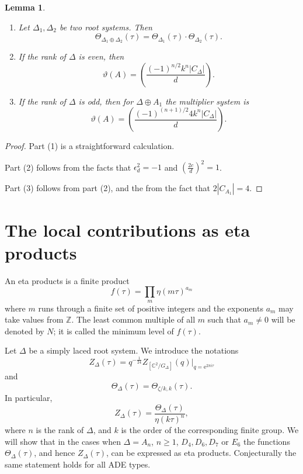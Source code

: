 \documentclass[11pt,a4paper]{amsart}
\newtheorem{lemma}[theorem]{Lemma}
\theoremstyle{definition}
\newcommand{\SZ}{\mathbb{Z}}                    %
\newcommand{\SC}{\mathbb{C}}                    %
\begin{document}
\begin{lemma} 
\begin{enumerate}
\item 
Let $\Delta_1,\Delta_2$ be two root systems. Then
\[ \Theta_{\Delta_1 \oplus \Delta_2}(\tau)=\Theta_{\Delta_1}(\tau)\cdot \Theta_{\Delta_2}(\tau). \]
\item If the rank of $\Delta$ is even, then
\[ \vartheta(A)= \left( \frac{(-1)^{n/2} k^n |C_{\Delta}|}{d} \right). \]
\item If the rank of $\Delta$ is odd, then for $\Delta \oplus A_1$ the multiplier system is
\[ \vartheta(A)= \left( \frac{(-1)^{(n+1)/2} 4k^n|C_{\Delta}|}{d} \right). \]
\end{enumerate}
\end{lemma}
\begin{proof} Part (1) is a straightforward calculation.

Part (2) follows from the facts that $\epsilon_d^2=-1$ and $\left( \frac{2c}{d}\right)^2=1$.

Part (3) follows from part (2), and the from the fact that $2|C_{A_1}|=4$.
\end{proof}

\section{The local contributions as eta products}
\label{sec:locetaprod}

An eta products is a finite product
\begin{equation} f(\tau)=\prod_m \eta(m \tau )^{a_m} 
\label{eq:etaproddef}
\end{equation}
where $m$ runs through a finite set of positive integers and the exponents
$a_m$ may take values from $\SZ$. The least common multiple of all $m$ such that $a_m\neq 0$ will be denoted by $N$; it is called the minimum level of $f(\tau)$.

Let $\Delta$ be a simply laced root system. We introduce the notations
\[ Z_{\Delta}(\tau)=q^{-\frac{1}{24}}Z_{[\SC^2/G_\Delta]}(q)\Big|_{q=\mathrm{e}^{2 \pi i \tau}}  \]
and 
\[  \Theta_{\Delta}(\tau)=\Theta_{ \zeta/k ,k}(\tau ). \]
In particular,
\[ Z_{\Delta}(\tau)=\frac{\Theta_{\Delta}(\tau)}{\eta(k\tau)^n}, \]
where $n$ is the rank of $\Delta$, and $k$ is the order of the corresponding finite group.
We will show that in the cases when $\Delta=A_n$, $n\geq 1$, $D_4, D_6, D_7$ or $E_6$ the functions $\Theta_{\Delta}(\tau)$, and hence $Z_{\Delta}(\tau)$, can be expressed as eta products. Conjecturally the same statement holds for all ADE types.
\end{document}
